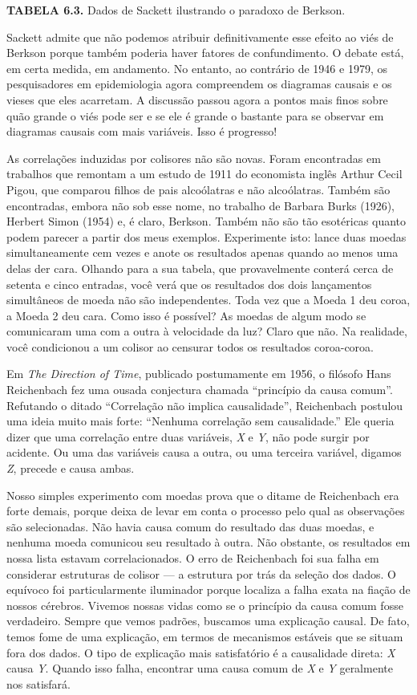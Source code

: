 \documentclass[11pt,a5paper,twoside]{book}
\begin{document}
\textbf{TABELA 6.3.} Dados de Sackett ilustrando o paradoxo de Berkson.

Sackett admite que não podemos atribuir definitivamente esse efeito ao viés de Berkson porque também poderia haver fatores de confundimento. O debate está, em certa medida, em andamento. No entanto, ao contrário de 1946 e 1979, os pesquisadores em epidemiologia agora compreendem os diagramas causais e os vieses que eles acarretam. A discussão passou agora a pontos mais finos sobre quão grande o viés pode ser e se ele é grande o bastante para se observar em diagramas causais com mais variáveis. Isso é progresso!

As correlações induzidas por colisores não são novas. Foram encontradas em trabalhos que remontam a um estudo de 1911 do economista inglês Arthur Cecil Pigou, que comparou filhos de pais alcoólatras e não alcoólatras. Também são encontradas, embora não sob esse nome, no trabalho de Barbara Burks (1926), Herbert Simon (1954) e, é claro, Berkson. Também não são tão esotéricas quanto podem parecer a partir dos meus exemplos. Experimente isto: lance duas moedas simultaneamente cem vezes e anote os resultados apenas quando ao menos uma delas der cara. Olhando para a sua tabela, que provavelmente conterá cerca de setenta e cinco entradas, você verá que os resultados dos dois lançamentos simultâneos de moeda não são independentes. Toda vez que a Moeda 1 deu coroa, a Moeda 2 deu cara. Como isso é possível? As moedas de algum modo se comunicaram uma com a outra à velocidade da luz? Claro que não. Na realidade, você condicionou a um colisor ao censurar todos os resultados coroa-coroa.

Em \textit{The Direction of Time}, publicado postumamente em 1956, o filósofo Hans Reichenbach fez uma ousada conjectura chamada “princípio da causa comum”. Refutando o ditado “Correlação não implica causalidade”, Reichenbach postulou uma ideia muito mais forte: “Nenhuma correlação sem causalidade.” Ele queria dizer que uma correlação entre duas variáveis, \textit{X} e \textit{Y}, não pode surgir por acidente. Ou uma das variáveis causa a outra, ou uma terceira variável, digamos \textit{Z}, precede e causa ambas.

Nosso simples experimento com moedas prova que o ditame de Reichenbach era forte demais, porque deixa de levar em conta o processo pelo qual as observações são selecionadas. Não havia causa comum do resultado das duas moedas, e nenhuma moeda comunicou seu resultado à outra. Não obstante, os resultados em nossa lista estavam correlacionados. O erro de Reichenbach foi sua falha em considerar estruturas de colisor — a estrutura por trás da seleção dos dados. O equívoco foi particularmente iluminador porque localiza a falha exata na fiação de nossos cérebros. Vivemos nossas vidas como se o princípio da causa comum fosse verdadeiro. Sempre que vemos padrões, buscamos uma explicação causal. De fato, temos fome de uma explicação, em termos de mecanismos estáveis que se situam fora dos dados. O tipo de explicação mais satisfatório é a causalidade direta: \textit{X} causa \textit{Y}. Quando isso falha, encontrar uma causa comum de \textit{X} e \textit{Y} geralmente nos satisfará.
\end{document}
